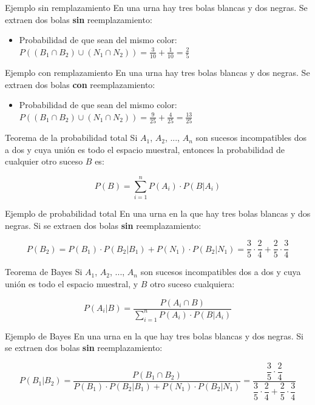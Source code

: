 \documentclass[11pt,handout]{beamer}
\begin{document}
\begin{frame}{Ejemplo sin remplazamiento}
En una urna hay tres bolas blancas y dos negras. Se extraen dos bolas \textbf{sin} reemplazamiento:

\begin{itemize}[<+->]
\item Probabilidad de que sean del mismo color: \\
$P((B_1\cap B_2)\cup (N_1\cap N_2))=\frac{3}{10}+\frac{1}{10}=\frac{2}{5}$
\end{itemize}

\end{frame}

\begin{frame}{Ejemplo con remplazamiento}
En una urna hay tres bolas blancas y dos negras. Se extraen dos bolas \textbf{con} reemplazamiento:

\begin{itemize}
\item Probabilidad de que sean del mismo color: \\
$P((B_1\cap B_2)\cup (N_1\cap N_2))=\frac{9}{25}+\frac{4}{25}=\frac{13}{25}$
\end{itemize}

\end{frame}



\begin{frame}{Teorema de la probabilidad total}
Si $A_1$, $A_2$, ..., $A_n$   son sucesos incompatibles dos a dos y cuya unión es todo el espacio muestral, entonces la probabilidad de cualquier otro suceso $B$ es:

$$P(B)=\sum_{i=1}^n P(A_i)\cdot  P(B|A_i) $$
\end{frame}

\begin{frame}{Ejemplo de probabilidad total}
En una urna en la que hay tres bolas blancas y dos negras. Si se extraen dos bolas \textbf{sin} reemplazamiento:


$$P(B_2)=P(B_1)\cdot P(B_2|B_1) + P(N_1)\cdot P(B_2|N_1)
= \frac{3}{5}\cdot\frac{2}{4} + \frac{2}{5}\cdot\frac{3}{4}$$
\end{frame}


\begin{frame}{Teorema de Bayes}
Si $A_1$, $A_2$, ..., $A_n$   son sucesos incompatibles dos a dos y cuya unión es todo el espacio muestral, y $B$ otro suceso cualquiera:

$$P(A_i|B)=\dfrac{P(A_i \cap B)}{\sum_{i=1}^n P(A_i)\cdot  P(B|A_i)} $$

\end{frame}

\begin{frame}{Ejemplo de Bayes}
En una urna en la que hay tres bolas blancas y dos negras. Si se extraen dos bolas \textbf{sin} reemplazamiento:


$$P(B_1|B_2)=\dfrac{P(B_1 \cap B_2)}{P(B_1)\cdot  P(B_2|B_1)+P(N_1)\cdot  P(B_2|N_1)}=\dfrac{\dfrac{3}{5}\cdot\dfrac{2}{4}}{\dfrac{3}{5}\cdot\dfrac{2}{4} + \dfrac{2}{5}\cdot\dfrac{3}{4}}$$
\end{frame}
\end{document}
